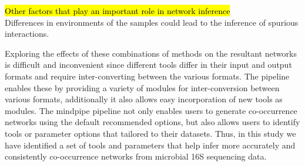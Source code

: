 \hl{Other factors that play an important role in network inference} \\
Differences in environments of the samples could lead to the inference of spurious interactions.

Exploring the effects of these combinations of methods on the resultant networks is difficult and inconvenient since different tools differ in their input and output formats and require inter-converting between the various formats.
The pipeline enables these by providing a variety of modules for inter-conversion between various formats, additionally it also allows easy incorporation of new tools as modules.
The mindpipe pipeline not only enables users to generate co-occurrence networks using the default recommended options, but also allows users to identify tools or parameter options that tailored to their datasets.
Thus, in this study we have identified a set of tools and parameters that help infer more accurately and consistently co-occurrence networks from microbial 16S sequencing data.
